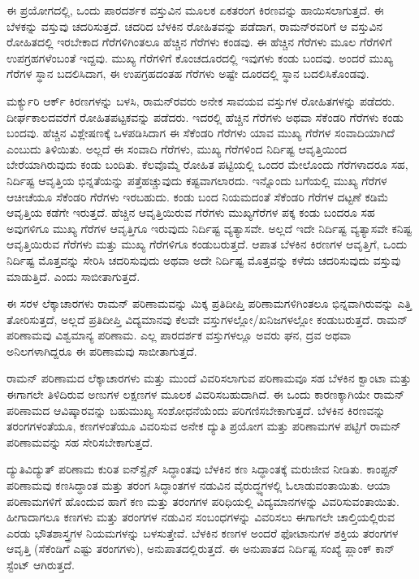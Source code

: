 ಈ ಪ್ರಯೋಗದಲ್ಲಿ, ಒಂದು ಪಾರದರ್ಶಕ ವಸ್ತುವಿನ ಮೂಲಕ ಏಕತರಂಗ ಕಿರಣವನ್ನು ಹಾಯಿಸಲಾಗುತ್ತದೆ. ಈ ಬೆಳಕನ್ನು ವಸ್ತುವು ಚದರಿಸುತ್ತದೆ. ಚದರಿದ ಬೆಳಕಿನ ರೋಹಿತವನ್ನು ಪಡೆದಾಗ, ರಾಮನ್‍ರವರಿಗೆ ಆ ವಸ್ತುವಿನ ರೋಹಿತದಲ್ಲಿ ಇರಬೇಕಾದ ಗೆರೆಗಳಿಗಿಂತಲೂ ಹೆಚ್ಚಿನ ಗೆರೆಗಳು ಕಂಡವು. ಈ ಹೆಚ್ಚಿನ ಗೆರೆಗಳು ಮೂಲ ಗೆರೆಗಳಿಗೆ ಉಪಗ್ರಹಗಳೆಂಬಂತೆ ಇದ್ದವು. ಮುಖ್ಯ ಗೆರೆಗಳಿಗೆ ಕೊಂಚದೂರದಲ್ಲಿ ಇವುಗಳು ಕಂಡು ಬಂದವು. ಅಂದರೆ ಮುಖ್ಯ ಗೆರೆಗಳ ಸ್ಥಾನ ಬದಲಿಸಿದಾಗ, ಈ ಉಪಗ್ರಹದಂತಹ ಗೆರೆಗಳು ಅಷ್ಟೇ ದೂರದಲ್ಲಿ ಸ್ಥಾನ ಬದಲಿಸಿಕೊಂಡವು.

ಮರ್ಕ್ಯುರಿ ಆರ್ಕ್ ಕಿರಣಗಳನ್ನು ಬಳಸಿ, ರಾಮನ್‍ರವರು ಅನೇಕ ಸಾವಯವ ವಸ್ತುಗಳ ರೋಹಿತಗಳನ್ನು ಪಡೆದರು. ದೀರ್ಘಕಾಲದವರೆಗೆ ರೋಹಿತಪಟ್ಟಕವನ್ನು ಪಡೆದರು. ಇದರಲ್ಲಿ ಹೆಚ್ಚಿನ ಗೆರೆಗಳು ಅಥವಾ ಸೆಕೆಂಡರಿ ಗೆರೆಗಳು ಕಂಡು ಬಂದವು. ಹೆಚ್ಚಿನ ವಿಶ್ಲೇಷಣಕ್ಕೆ ಒಳಪಡಿಸಿದಾಗ ಈ ಸೆಕೆಂಡರಿ ಗೆರೆಗಳು ಯಾವ ಮುಖ್ಯ ಗೆರೆಗಳ ಸಂವಾದಿಯಾಗಿದೆ ಎಂಬುದು ತಿಳಿಯಿತು. ಅಲ್ಲದೆ ಈ ಸಂವಾದಿ ಗೆರೆಗಳು, ಮುಖ್ಯ ಗೆರೆಗಳಿಂದ ನಿರ್ದಿಷ್ಟ ಆವೃತ್ತಿಯಿಂದ ಬೇರೆಯಾಗಿರುವುದು ಕಂಡು ಬಂದಿತು. ಕೆಲವೊಮ್ಮೆ ರೋಹಿತ ಪಟ್ಟಿಯಲ್ಲಿ ಒಂದರ ಮೇಲೊಂದು ಗೆರೆಗಳಾದರೂ ಸಹ, ನಿರ್ದಿಷ್ಟ ಆವೃತ್ತಿಯ ಭಿನ್ನತೆಯನ್ನು ಪತ್ತೆಹಚ್ಚುವುದು ಕಷ್ಟವಾಗಲಾರದು. ಇನ್ನೊಂದು ಬಗೆಯಲ್ಲಿ ಮುಖ್ಯ ಗೆರೆಗಳ ಆಚೀಚೆಯೂ ಸೆಕೆಂಡರಿ ಗೆರೆಗಳು ಇರಬಹುದು. ಕಂಡು ಬಂದ ನಿಯಮದಂತೆ ಸೆಕೆಂಡರಿ ಗೆರೆಗಳ ದಟ್ಟಣೆ ಕಡಿಮೆ ಆವೃತ್ತಿಯ ಕಡೆಗೇ ಇರುತ್ತದೆ. ಹೆಚ್ಚಿನ ಆವೃತ್ತಿಯಿರುವ ಗೆರೆಗಳು ಮುಖ್ಯಗೆರೆಗಳ ಪಕ್ಕ ಕಂಡು ಬಂದರೂ ಸಹ ಅವುಗಳಿಗೂ ಮುಖ್ಯ ಗೆರೆಗಳ ಆವೃತ್ತಿಗೂ ಇರುವುದು ನಿರ್ದಿಷ್ಟ ವ್ಯತ್ಯಾಸವೇ. ಅಲ್ಲದೆ ಇದೇ ನಿರ್ದಿಷ್ಟ ವ್ಯತ್ಯಾಸವೇ ಕನಿಷ್ಟ ಆವೃತ್ತಿಯಿರುವ ಗೆರೆಗಳು ಮತ್ತು ಮುಖ್ಯ ಗೆರೆಗಳಿಗೂ ಕಂಡುಬರುತ್ತದೆ. ಆಪಾತ ಬೆಳಕಿನ ಕಿರಣಗಳ ಆವೃತ್ತಿಗೆ, ಒಂದು ನಿರ್ದಿಷ್ಟ ಮೊತ್ತವನ್ನು ಸೇರಿಸಿ ಚದರಿಸುವುದು ಅಥವಾ ಅದೇ ನಿರ್ದಿಷ್ಟ ಮೊತ್ತವನ್ನು ಕಳೆದು ಚದರಿಸುವುದು ವಸ್ತುವು ಮಾಡುತ್ತಿದೆ. ಎಂದು ಸಾಬೀತಾಗುತ್ತದೆ.

ಈ ಸರಳ ಲೆಕ್ಕಾಚಾರಗಳು ರಾಮನ್ ಪರಿಣಾಮವನ್ನು ಮಿಕ್ಕ ಪ್ರತಿದೀಪ್ತಿ ಪರಿಣಾಮಗಳಿಗಿಂತಲೂ ಭಿನ್ನವಾಗಿರುವನ್ನು ಎತ್ತಿ ತೋರಿಸುತ್ತದೆ, ಅಲ್ಲದೆ ಪ್ರತಿದೀಪ್ತಿ ವಿದ್ಯಮಾನವು ಕೆಲವೇ ವಸ್ತುಗಳಲ್ಲೋ/ಖನಿಜಗಳಲ್ಲೋ ಕಂಡುಬರುತ್ತದೆ. ರಾಮನ್ ಪರಿಣಾಮವು ವಿಶ್ವಮಾನ್ಯ ಪರಿಣಾಮ. ಎಲ್ಲ ಪಾರದರ್ಶಕ ವಸ್ತುಗಳಲ್ಲೂ ಅವರು ಘನ, ದ್ರವ ಅಥವಾ ಅನಿಲಗಳಾಗಿದ್ದರೂ ಈ ಪರಿಣಾಮವು ಸಾಬೀತಾಗುತ್ತದೆ.

ರಾಮನ್ ಪರಿಣಾಮದ ಲೆಕ್ಕಾಚಾರಗಳು ಮತ್ತು ಮುಂದೆ ವಿವರಿಸಲಾಗುವ ಪರಿಣಾಮವೂ ಸಹ ಬೆಳಕಿನ ಕ್ವಾಂಟಾ ಮತ್ತು ಈಗಾಗಲೇ ತಿಳಿದಿರುವ ಅಣುಗಳ ಲಕ್ಷಣಗಳ ಮೂಲಕ ವಿವರಿಸಬಹುದಾಗಿದೆ. ಈ ಒಂದು ಕಾರಣಕ್ಕಾಗಿಯೇ ರಾಮನ್ ಪರಿಣಾಮದ ಆವಿಷ್ಕಾರವನ್ನು ಬಹುಮುಖ್ಯ ಸಂಶೋಧನೆಯೆಂದು ಪರಿಗಣಿಸಬೇಕಾಗುತ್ತದೆ. ಬೆಳಕಿನ ಕಿರಣವನ್ನು ತರಂಗಗಳಂತೆಯೂ, ಕಣಗಳಂತೆಯೂ ವಿವರಿಸುವ ಅನೇಕ ದ್ಯುತಿ ಪ್ರಯೋಗ ಮತ್ತು ಪರಿಣಾಮಗಳ ಪಟ್ಟಿಗೆ ರಾಮನ್ ಪರಿಣಾಮವನ್ನು ಸಹ ಸೇರಿಸಬೇಕಾಗುತ್ತದೆ.

ದ್ಯುತಿವಿದ್ಯುತ್ ಪರಿಣಾಮ ಕುರಿತ ಐನ್‍ಸ್ಟೈನ್ ಸಿದ್ಧಾಂತವು ಬೆಳಕಿನ ಕಣ ಸಿದ್ಧಾಂತಕ್ಕೆ ಮರುಜೀವ ನೀಡಿತು.  ಕಾಂಪ್ಟನ್ ಪರಿಣಾಮವು ಕಣಸಿದ್ಧಾಂತ ಮತ್ತು ತರಂಗ ಸಿದ್ಧಾಂತಗಳ ನಡುವಿನ ವೈರುದ್ಧ್ಯಗಳಲ್ಲಿ ಓಲಾಡುವಂತಾಯಿತು. ಆಯಾ ಪರಿಣಾಮಗಳಿಗೆ ಹೊಂದುವ ಹಾಗೆ ಕಣ ಮತ್ತು ತರಂಗಗಳ ಪರಿಧಿಯಲ್ಲಿ ವಿದ್ಯಮಾನಗಳನ್ನು ವಿವರಿಸುವಂತಾಯಿತು. ಹೀಗಾದಾಗಲೂ ಕಣಗಳು ಮತ್ತು ತರಂಗಗಳ ನಡುವಿನ ಸಂಬಂಧಗಳನ್ನು ವಿವರಿಸಲು ಈಗಾಗಲೇ ಚಾಲ್ತಿಯಲ್ಲಿರುವ ಎರಡು ಭೌತಶಾಸ್ತ್ರಗಳ ನಿಯಮಗಳನ್ನು ಬಳಸುತ್ತೇವೆ. ಬೆಳಕಿನ ಕಣಗಳ ಅಂದರೆ ಫೋಟಾನುಗಳ ಶಕ್ತಿಯ ತರಂಗಗಳ ಆವೃತ್ತಿ (ಸೆಕೆಂಡಿಗೆ ಎಷ್ಟು ತರಂಗಗಳು), ಅನುಪಾತದಲ್ಲಿರುತ್ತದೆ. ಈ ಅನುಪಾತದ ನಿರ್ದಿಷ್ಟ ಸಂಖ್ಯೆ ಪ್ಲಾಂಕ್ ಕಾನ್ ಸ್ಟೆಂಟ್  ಆಗಿರುತ್ತದೆ.


